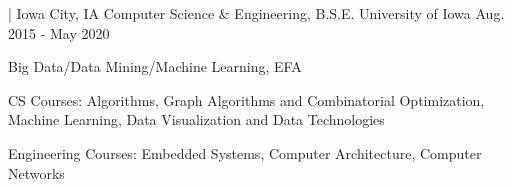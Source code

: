 
\begin{cventries}
  
  \cventry
    {| Iowa City, IA} %
    {Computer Science \& Engineering, B.S.E.} %
    {University of Iowa} %
    {Aug. 2015 - May 2020} %
    {
      \begin{cvitems} %
        \item {Big Data/Data Mining/Machine Learning, EFA}
        \item {CS Courses: Algorithms, Graph Algorithms and Combinatorial Optimization, Machine Learning, Data Visualization and Data Technologies}
        \item {Engineering Courses: Embedded Systems, Computer Architecture, Computer Networks}
      \end{cvitems}
    }
    

\end{cventries}
